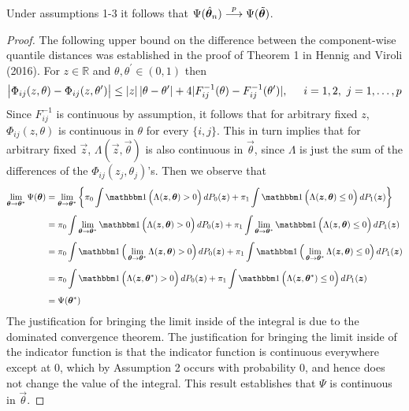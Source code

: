 \begin{theorem}
  Under assumptions 1-3 it follows that
  $\Psi(\hat{\bm{\theta}}_n) \stackrel{p}{\longrightarrow} \Psi(\tilde{\bm{\theta}})$.
\end{theorem}

\begin{proof}
  The following upper bound on the difference between the component-wise
  quantile distances was established in the proof of Theorem 1 in Hennig and
  Viroli (2016).  For $z \in \mathbb{R}$ and
  $\theta, \theta^{\prime} \in (0, 1)$ then
  \begin{equation}
    \label{eq:quantile-distance-ubnd}
    \big| \Phi_{ij}(z, \theta) - \Phi_{ij}(z, \theta^{\prime}) \big|
    \leq |z|\, | \theta - \theta^{\prime} | +
    4 | F_{ij}^{-1}(\theta) - F_{ij}^{-1}(\theta^{\prime}) |,
    \hspace{5mm} i = 1, 2,~ j = 1, \dots, p
  \end{equation}
  Since $F_{ij}^{-1}$ is continuous by assumption, it follows that for arbitrary
  fixed $z$, $\Phi_{ij}(z, \theta)$ is continuous in $\theta$ for every
  $\{i, j\}$.  This in turn implies that for arbitrary fixed $\vec{z}$,
  $\Lambda(\vec{z}, \vec{\theta})$ is also continuous in $\vec{\theta}$, since
  $\Lambda$ is just the sum of the differences of the
  $\Phi_{ij}(z_j, \theta_j)$'s.  Then we observe that
  \begin{align}
    \label{eq:multivariate-phi-continuity}
    \begin{split}
      \limtheta \Psi(\vec{\theta})
      & = \limtheta \left\{
        \pi_0 \int \ind\Big( \Lambda(\vec{z}, \vec{\theta}) > 0 \Big)\, dP_0(\vec{z}) +
        \pi_1 \int \ind\Big(\Lambda(\vec{z}, \vec{\theta}) \leq 0 \Big)\, dP_1(\vec{z})
      \right\} \\[1ex]
      & = \pi_0 \int \limtheta \ind\Big( \Lambda(\vec{z}, \vec{\theta}) > 0 \Big)\, dP_0(\vec{z})
      + \pi_1 \int \limtheta \ind\Big(\Lambda(\vec{z}, \vec{\theta}) \leq 0 \Big)\, dP_1(\vec{z})
      \\[1ex]
      & = \pi_0 \int \ind \Big( \limtheta \Lambda(\vec{z}, \vec{\theta}) > 0 \Big)\, dP_0(\vec{z})
      + \pi_1 \int \ind \Big( \limtheta \Lambda(\vec{z}, \vec{\theta}) \leq 0 \Big)\, dP_1(\vec{z})
      \\[1ex]
      & = \pi_0 \int \ind \Big( \Lambda(\vec{z}, \vec{\theta}^{*}) > 0 \Big)\, dP_0(\vec{z})
      + \pi_1 \int \ind \Big( \Lambda(\vec{z}, \vec{\theta}^{*}) \leq 0 \Big)\, dP_1(\vec{z})
      \\[1ex]
      & = \Psi(\vec{\theta}^{*})
    \end{split}
  \end{align}
  The justification for bringing the limit inside of the integral is due to the
  dominated convergence theorem.  The justification for bringing the limit
  inside of the indicator function is that the indicator function is continuous
  everywhere except at 0, which by Assumption 2 occurs with probability 0, and
  hence does not change the value of the integral.  This result establishes that
  $\Psi$ is continuous in $\vec{\theta}$.


\end{proof}
